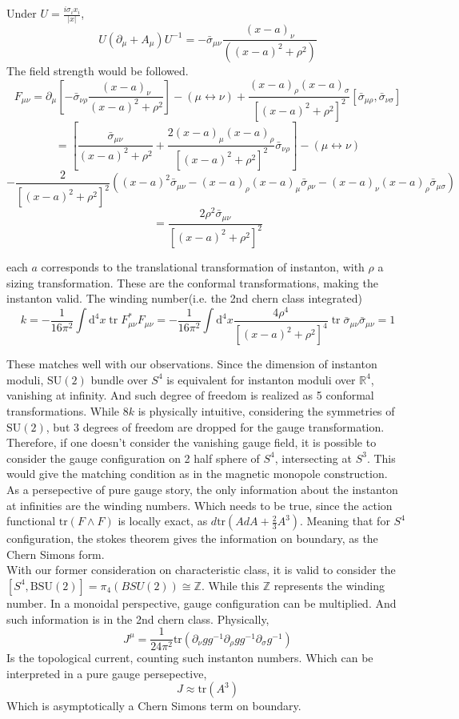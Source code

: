 \documentclass{article}
\begin{document}
Under $U=\frac{i\sigma_i x_i}{|x|}$, 
\[
    U(\partial_\mu +A_\mu )U^{-1} =  -\bar{\sigma}_{\mu\nu}\frac{(x-a)_\nu}{((x-a)^2+\rho^2)}
\]
The field strength would be followed.
\[
    F_{\mu \nu}=  \partial_\mu\left[-\bar{\sigma}_{\nu \rho} \frac{(x-a)_\nu}{(x-a)^2+\rho^2}\right]-(\mu \leftrightarrow \nu)+\frac{(x-a)_\rho(x-a)_\sigma}{\left[(x-a)^2+\rho^2\right]^2}\left[\bar{\sigma}_{\mu \rho}, \bar{\sigma}_{\nu \sigma}\right] 
\]
\[=  {\left[\frac{\bar{\sigma}_{\mu \nu}}{(x-a)^2+\rho^2}+\frac{2(x-a)_\mu(x-a)_\rho}{\left[(x-a)^2+\rho^2\right]^2} \bar{\sigma}_{\nu \rho}\right]-(\mu \leftrightarrow \nu) } 
\]
\[ -\frac{2}{\left[(x-a)^2+\rho^2\right]^2}\left((x-a)^2 \bar{\sigma}_{\mu \nu}-(x-a)_\rho(x-a)_\mu \bar{\sigma}_{\rho \nu}-(x-a)_\nu(x-a)_\rho \bar{\sigma}_{\mu \sigma}\right) 
\]
\[  =\frac{2 \rho^2 \bar{\sigma}_{\mu \nu}}{\left[(x-a)^2+\rho^2\right]^2}\]

    each $a$ corresponds to the translational transformation of instanton, with $\rho$ a sizing transformation. These are the conformal transformations, making the instanton valid. 
The winding number(i.e. the 2nd chern class integrated)
\[
    k=-\frac{1}{16 \pi^2} \int \mathrm{d}^4 x \operatorname{tr} F_{\mu \nu}^* F_{\mu \nu}=-\frac{1}{16 \pi^2} \int \mathrm{d}^4 x \frac{4 \rho^4}{\left[(x-a)^2+\rho^2\right]^4} \operatorname{tr} \bar{\sigma}_{\mu \nu} \bar{\sigma}_{\mu \nu}=1
\]


These matches well with our observations. Since the dimension of instanton moduli, $\mathrm{SU}(2)$ bundle over $S^4$ is equivalent for instanton moduli over $\mathbb{R}^4$, vanishing at infinity. And such degree of freedom is realized as 5 conformal transformations. While $8k$ is physically intuitive, considering the symmetries of $\mathrm{SU}(2)$, but 3 degrees of freedom are dropped for the gauge transformation.
\\
Therefore, if one doesn't consider the vanishing gauge field, it is possible to consider the gauge configuration on 2 half sphere of $S^4$, intersecting at $S^3$. This would give the matching condition as in the magnetic monopole construction.
\\
As a persepective of pure gauge story, the only information about the instanton at infinities are the winding numbers. Which needs to be true, since the action functional $\mathrm{tr}(F\wedge F)$ is locally exact, as $d\mathrm{tr}(A dA + \frac{2}{3}A^3)$. Meaning that for $S^4$ configuration, the stokes theorem gives the information on boundary, as the Chern Simons form. 
\\
With our former consideration on characteristic class, it is valid to consider the $[S^4,\mathrm{BSU}(2)]=\pi_4(BSU(2))\cong\mathbb{Z}$. While this $\mathbb{Z}$ represents the winding number. In a monoidal perspective, gauge configuration can be multiplied. And such information is in the 2nd chern class. Physically,
\[
    J^\mu = \frac{1}{24\pi^2}\mathrm{tr}(\partial_\nu g g^{-1}\partial_\rho g g^{-1}\partial_\sigma g^{-1})
\]
Is the topological current, counting such instanton numbers. Which can be interpreted in a pure gauge persepective, 
\[
    J \approx \mathrm{tr}(A^3)
\]
Which is asymptotically a Chern Simons term on boundary.
\end{document}
